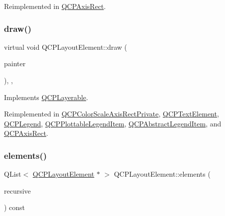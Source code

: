 Reimplemented in \mbox{\hyperlink{class_q_c_p_axis_rect_ac51055d83f5f414b6d013d3a24b0a941}{Q\+C\+P\+Axis\+Rect}}.

\mbox{\label{class_q_c_p_layout_element_ad1c597b1d608cfdd86e7b76819a94cfb}} 
\subsubsection{\texorpdfstring{draw()}{draw()}}
{\footnotesize\ttfamily virtual void Q\+C\+P\+Layout\+Element\+::draw (\begin{DoxyParamCaption}\item[{\mbox{\hyperlink{class_q_c_p_painter}{Q\+C\+P\+Painter}} $\ast$}]{painter }\end{DoxyParamCaption})\hspace{0.3cm}{\ttfamily [inline]}, {\ttfamily [protected]}, {\ttfamily [virtual]}}



Implements \mbox{\hyperlink{class_q_c_p_layerable_aecf2f7087482d4b6a78cb2770e5ed12d}{Q\+C\+P\+Layerable}}.



Reimplemented in \mbox{\hyperlink{class_q_c_p_color_scale_axis_rect_private_a52a21c7cbe086cd587c955cfe6e25e3b}{Q\+C\+P\+Color\+Scale\+Axis\+Rect\+Private}}, \mbox{\hyperlink{class_q_c_p_text_element_ad1dae61ea77ae74841f3c2fb765fc88e}{Q\+C\+P\+Text\+Element}}, \mbox{\hyperlink{class_q_c_p_legend_a74f93358d2b4a76ec95c3a5d825582a3}{Q\+C\+P\+Legend}}, \mbox{\hyperlink{class_q_c_p_plottable_legend_item_a5838366619200e99680afa6d355d13fa}{Q\+C\+P\+Plottable\+Legend\+Item}}, \mbox{\hyperlink{class_q_c_p_abstract_legend_item_a14ce0b09f5b814c765a0d790bd838909}{Q\+C\+P\+Abstract\+Legend\+Item}}, and \mbox{\hyperlink{class_q_c_p_axis_rect_af710c50530e370539a4439d6c4db9090}{Q\+C\+P\+Axis\+Rect}}.

\mbox{\label{class_q_c_p_layout_element_a76dec8cb31e498994a944d7647a43309}} 
\subsubsection{\texorpdfstring{elements()}{elements()}}
{\footnotesize\ttfamily Q\+List$<$ \mbox{\hyperlink{class_q_c_p_layout_element}{Q\+C\+P\+Layout\+Element}} $\ast$ $>$ Q\+C\+P\+Layout\+Element\+::elements (\begin{DoxyParamCaption}\item[{bool}]{recursive }\end{DoxyParamCaption}) const\hspace{0.3cm}{\ttfamily [virtual]}}

